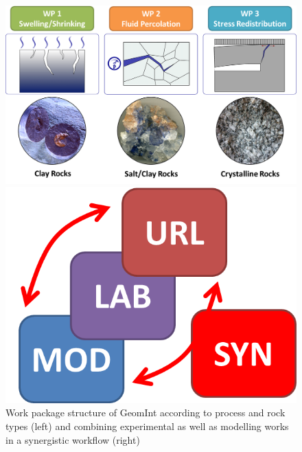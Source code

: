 \begin{figure}[t!]
\begin{minipage}{0.69\textwidth}
\includegraphics[width=1\textwidth]{figures/geomint-concept-02.png}
\end{minipage}
\hfill
\begin{minipage}{0.29\textwidth}
\includegraphics[width=1\textwidth]{figures/modal01a.png}
\end{minipage}
\caption{Work package structure of GeomInt according to process and rock types (left) and combining experimental as well as modelling works in a synergistic workflow (right)}
\label{fig:pro02}
\end{figure}

